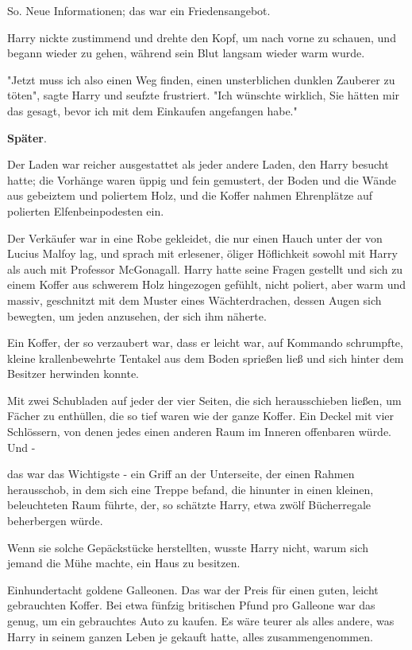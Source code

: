 {So. Neue Informationen; das war ein Friedensangebot.

Harry nickte zustimmend und drehte den Kopf, um nach vorne zu schauen, und begann wieder zu gehen, während sein Blut langsam wieder warm wurde.

"Jetzt muss ich also einen Weg finden, einen unsterblichen dunklen Zauberer zu töten", sagte Harry und seufzte frustriert. "Ich wünschte wirklich, Sie hätten mir das gesagt, bevor ich mit dem Einkaufen angefangen habe."

\textbf{Später}.

Der Laden war reicher ausgestattet als jeder andere Laden, den Harry besucht hatte; die Vorhänge waren üppig und fein gemustert, der Boden und die Wände aus gebeiztem und poliertem Holz, und die Koffer nahmen Ehrenplätze auf polierten Elfenbeinpodesten ein.

Der Verkäufer war in eine Robe gekleidet, die nur einen Hauch unter der von Lucius Malfoy lag, und sprach mit erlesener, öliger Höflichkeit sowohl mit Harry als auch mit Professor McGonagall. Harry hatte seine Fragen gestellt und sich zu einem Koffer aus schwerem Holz hingezogen gefühlt, nicht poliert, aber warm und massiv, geschnitzt mit dem Muster eines Wächterdrachen, dessen Augen sich bewegten, um jeden anzusehen, der sich ihm näherte.

Ein Koffer, der so verzaubert war, dass er leicht war, auf Kommando schrumpfte, kleine krallenbewehrte Tentakel aus dem Boden sprießen ließ und sich hinter dem Besitzer herwinden konnte.

Mit zwei Schubladen auf jeder der vier Seiten, die sich herausschieben ließen, um Fächer zu enthüllen, die so tief waren wie der ganze Koffer. Ein Deckel mit vier Schlössern, von denen jedes einen anderen Raum im Inneren offenbaren würde. Und -

das war das Wichtigste - ein Griff an der Unterseite, der einen Rahmen herausschob, in dem sich eine Treppe befand, die hinunter in einen kleinen, beleuchteten Raum führte, der, so schätzte Harry, etwa zwölf Bücherregale beherbergen würde.

Wenn sie solche Gepäckstücke herstellten, wusste Harry nicht, warum sich jemand die Mühe machte, ein Haus zu besitzen.

Einhundertacht goldene Galleonen. Das war der Preis für einen guten, leicht gebrauchten Koffer. Bei etwa fünfzig britischen Pfund pro Galleone war das genug, um ein gebrauchtes Auto zu kaufen. Es wäre teurer als alles andere, was Harry in seinem ganzen Leben je gekauft hatte, alles zusammengenommen.

}
